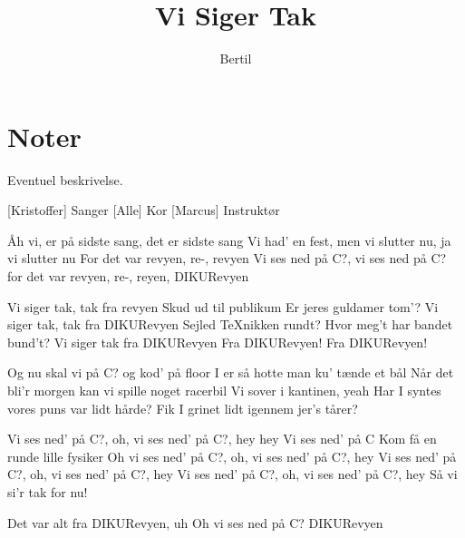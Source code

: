 \documentclass{article}
\title{Vi Siger Tak}                   %
\author{Bertil}  %
\begin{document}
                
\maketitle
\section*{Noter}                %
Eventuel beskrivelse.

\begin{roles}
[Kristoffer] Sanger
[Alle] Kor
[Marcus] Instruktør
\end{roles}

\begin{props}
\end{props}

\newpage%
\begin{song}
%
Åh vi, er på sidste sang, det er sidste sang
Vi had’ en fest, men vi slutter nu, ja vi slutter nu
For det var revyen, re-, revyen
Vi ses ned på C?, vi ses ned på C? for det var
revyen, re-, reyen,
DIKURevyen


Vi siger tak, tak fra revyen
Skud ud til publikum
Er jeres guldamer tom’?
Vi siger tak, tak fra DIKURevyen
Sejled TeXnikken rundt?
Hvor meg’t har bandet bund’t?
Vi siger tak fra DIKURevyen
%
Fra DIKURevyen!
Fra DIKURevyen!

%
Og nu skal vi på C? og kod’ på floor
I er så hotte man ku’ tænde et bål
Når det bli’r morgen kan vi spille noget racerbil
Vi sover i kantinen, yeah
Har I syntes vores puns var lidt hårde?
Fik I grinet lidt igennem jer’s tårer?

%
Vi ses ned’ på C?, oh, vi ses ned’ på C?, hey hey
Vi ses ned’ på C
%
Kom få en runde lille fysiker
%
Oh vi ses ned’ på C?, oh, vi ses ned’ på C?, hey
Vi ses ned’ på C?, oh, vi ses ned’ på C?, hey
Vi ses ned’ på C?, oh, vi ses ned’ på C?, hey
Så vi si’r tak for nu!

%
Det var alt fra DIKURevyen, uh
%
Oh vi ses ned på C?
DIKURevyen


\end{song}
\end{document}

